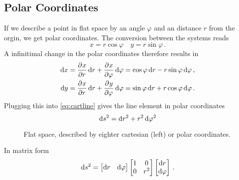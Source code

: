 \subsection*{Polar Coordinates}
If we describe a point in flat space by an angle $\varphi$ and an distance $r$
from the orgin, we get polar coordinates. The conversion between the systems
reads
\begin{equation}
    x= r\cos\varphi\quad y= r\sin\varphi\,.
\end{equation}
A infinitimal change in the polar coordinates therefore results in 
\begin{align}
    \dif x&= \dpd{x}{r}\dif r+\dpd{x}{\varphi}\dif \varphi = \cos\varphi\dif
    r-r\sin\varphi\dif \varphi\,,\\
    \dif y&= \dpd{x}{r}\dif r+\dpd{y}{\varphi}\dif \varphi = \sin\varphi\dif
    r+r\cos\varphi\dif \varphi\,.
\end{align}
Plugging this into \eqref{eq:cartline} gives the line element in polar coordinates
\begin{equation}
    \dif s^2=\dif r^2+r^2\dif \varphi^2
\end{equation}
\begin{figure}
    \centering
    \caption{Flat space, described by eighter cartesian (left) or polar
    coordinates.}
\end{figure}
In matrix form
\begin{equation}
    \dif s^2=
    \begin{bmatrix}
        \dif r& \dif \varphi
    \end{bmatrix}
    \begin{bmatrix}
        1& 0\\
        0& r^2\\
    \end{bmatrix}
    \begin{bmatrix}
        \dif r\\ \dif \varphi
    \end{bmatrix}\, .
\end{equation}
